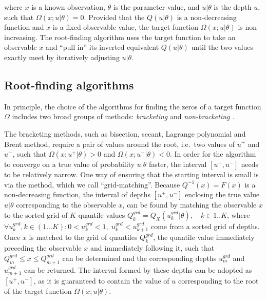\documentclass[
  12pt,
]{article}
\begin{document}
where \(x\) is a known observation, \(\theta\) is the parameter value, and \(u|\theta\) is the depth \(u\), such that \(\Omega(x;u|\theta)=0\). Provided that the \(Q(u|\theta)\) is a non-decreasing function and \(x\) is a fixed observable value, the target function \(\Omega(x;u|\theta)\) is non-increasing. The root-finding algorithm uses the target function to take an observable \(x\) and ``pull in'' its inverted equivalent \(Q(u|\theta)\) until the two values exactly meet by iteratively adjusting \(u|\theta\).

\hypertarget{root-finding-algorithms}{%
\subsection{Root-finding algorithms}\label{root-finding-algorithms}}

In principle, the choice of the algorithms for finding the zeros of a target function \(\Omega\) includes two broad groups of methods: \emph{bracketing} and \emph{non-bracketing} \citep{atkinson2008IntroductionNumericalAnalysis, burden2011NumericalAnalysis}.

The bracketing methods, such as bisection, secant, Lagrange polynomial and Brent method, require a pair of values around the root, i.e.~two values of \(u^+\) and \(u^-\), such that \(\Omega(x;u^+|\theta)>0\) and \(\Omega(x;u^-|\theta)<0\). In order for the algorithm to converge on a true value of probability \(u|\theta\) faster, the interval \([u^+, u^-]\) needs to be relatively narrow. One way of ensuring that the starting interval is small is via the method, which we call ``grid-matching''. Because \(Q^{-1}(x)=F(x)\) is a non-decreasing function, the interval of depths \([u^+, u^-]\) enclosing the true value \(u|\theta\) corresponding to the observable \(x\), can be found by matching the observable \(x\) to the sorted grid of \(K\) quantile values \(Q^{grd}_k=Q_X(u^{grd}_k|\theta), \quad k \in 1..K\), where \(\forall u^{grd}_k, k \in (1\dots K): 0<u^{grd}_k<1, \; u^{grd}_k<u^{grd}_{k+1}\) come from a sorted grid of depths. Once \(x\) is matched to the grid of quantiles \(Q^{grd}_k\), the quantile value immediately preceding the observable \(x\) and immediately following it, such that \(Q^{grd}_{m} \leq x \leq Q^{grd}_{m+1}\) can be determined and the corresponding depths \(u^{grd}_m\) and \(u^{grd}_{m+1}\) can be returned. The interval formed by these depths can be adopted as \([u^+, u^-]\), as it is guaranteed to contain the value of \(u\) corresponding to the root of the target function \(\Omega(x;u|\theta)\).
\end{document}
